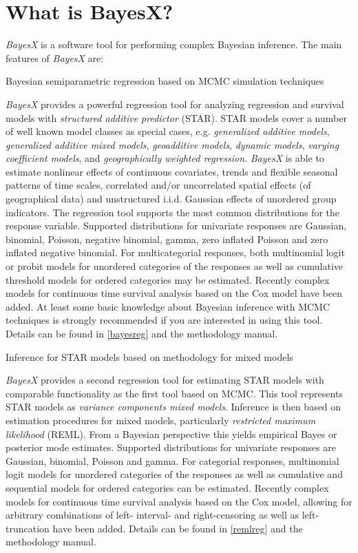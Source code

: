 \chapter{What is BayesX?}

{\em BayesX} is a software tool for performing complex Bayesian
inference. The main features of {\em BayesX} are:

\begin{stanza}{Bayesian semiparametric regression based on MCMC simulation techniques}

{\em BayesX} provides a powerful regression tool for analyzing
regression and survival models with {\em structured additive
predictor} (STAR). STAR models cover a number of well known model
classes as special cases, e.g. {\em generalized additive models},
{\em generalized additive mixed models}, {\em geoadditive models},
{\em dynamic models}, {\em varying coefficient models}, and {\em
geographically weighted regression}. {\em BayesX} is able to
estimate nonlinear effects of continuous covariates, trends and
flexible seasonal patterns of time scales, correlated and/or
uncorrelated spatial effects (of geographical data) and
unstructured i.i.d. Gaussian effects of unordered group
indicators. The regression tool  supports the most common
distributions for the response variable. Supported distributions
for univariate responses are Gaussian, binomial, Poisson, negative
binomial, gamma, zero inflated Poisson and zero inflated negative
binomial. For multicategorial responses, both multinomial logit or
probit models for unordered categories of the responses as well as
cumulative threshold models for ordered categories may be
estimated. Recently complex models for continuous time survival
analysis based on the Cox model have been added. At least some
basic knowledge about Bayesian inference with MCMC techniques is
strongly recommended if you are interested in using this tool.
Details can be found in \autoref{bayesreg} and the methodology
manual.
\end{stanza}

\begin{stanza}{Inference for STAR models based on methodology for mixed models}

{\em BayesX} provides a second regression tool for estimating STAR
models with comparable functionality as the first tool based on
MCMC. This tool represents STAR models as {\em variance components
mixed models}. Inference is then based on estimation procedures
for mixed models, particularly {\em restricted maximum likelihood}
(REML). From a Bayesian perspective this yields empirical Bayes or
posterior mode estimates. Supported distributions for univariate
responses are Gaussian, binomial, Poisson and gamma. For
categorial responses, multinomial logit models for unordered
categories of the responses as well as cumulative and sequential
models for ordered categories can be estimated. Recently complex
models for continuous time survival analysis based on the Cox
model, allowing for arbitrary combinations of left- interval- and
right-censoring as well as left-truncation have been added.
Details can be found in \autoref{remlreg} and the methodology
manual.
\end{stanza}

